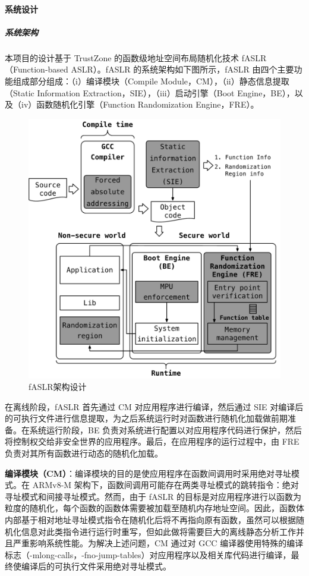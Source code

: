 \documentclass[12pt,a4paper]{ctexart}
\numberwithin{figure}{section}
\begin{document}
\paragraph{系统设计}
\subparagraph{系统架构}
\par 本项目的设计基于 TrustZone 的函数级地址空间布局随机化技术 fASLR（Function-based ASLR）。fASLR 的系统架构如下图所示，fASLR 由四个主要功能组成部分组成：（i）编译模块（Compile Module，CM），（ii）静态信息提取（Static Information Extraction，SIE），（iii）启动引擎（Boot Engine，BE），以及（iv）函数随机化引擎（Function Randomization Engine，FRE）。
\begin{figure}[h]
    \centering
    \includegraphics[scale=0.5]{graph/aslr_architecture.png}
    \caption{fASLR架构设计}
\end{figure}
\par 在离线阶段，fASLR 首先通过 CM 对应用程序进行编译，然后通过 SIE 对编译后的可执行文件进行信息提取，为之后系统运行时对函数进行随机化加载做前期准备。在系统运行阶段，BE 负责对系统进行配置以对应用程序代码进行保护，然后将控制权交给非安全世界的应用程序。最后，在应用程序的运行过程中，由 FRE 负责对其所有函数进行动态的随机化加载。
\par \textbf{编译模块（CM）}：编译模块的目的是使应用程序在函数间调用时采用绝对寻址模式。在 ARMv8-M 架构下，函数间调用可能存在两类寻址模式的跳转指令：绝对寻址模式和间接寻址模式。然而，由于 fASLR 的目标是对应用程序进行以函数为粒度的随机化，每个函数的函数体需要被加载至随机内存地址空间。因此，函数体内部基于相对地址寻址模式指令在随机化后将不再指向原有函数，虽然可以根据随机化信息对此类指令进行运行时重写，但如此做将需要巨大的离线静态分析工作并且严重影响系统性能。为解决上述问题，CM 通过对 GCC 编译器使用特殊的编译标志（-mlong-calls，-fno-jump-tables）对应用程序以及相关库代码进行编译，最终使编译后的可执行文件采用绝对寻址模式。
\end{document}
